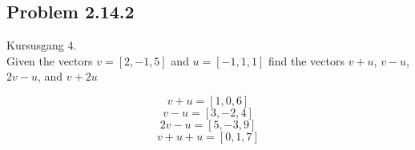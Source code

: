 \subsection{Problem 2.14.2}
Kursusgang 4.\\
Given the vectors $v=[2,-1,5]$ and $u=[-1,1,1]$ find the vectors $v+u$, $v-u$, $2v-u$, and $v+2u$

\begin{equation}
        v+u=[1,0,6]
    \end{equation}
\begin{equation}
        v-u=[3,-2,4]
    \end{equation}
\begin{equation}
        2v-u=[5,-3, 9]
    \end{equation}
\begin{equation}
        v+u+u=[0,1,7]
    \end{equation}
